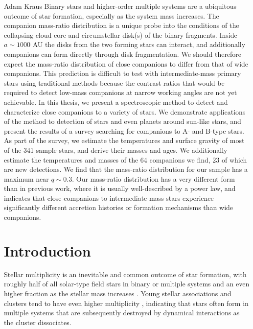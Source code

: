 \documentclass{utthesis}
\begin{document}
%
%

\begin{UTabstract}{Adam Kraus}
Binary stars and higher-order multiple systems are a ubiquitous outcome of star formation, especially as the system mass increases. The companion mass-ratio distribution is a unique probe into the conditions of the collapsing cloud core and circumstellar disk(s) of the binary fragments. Inside $a \sim 1000$ AU the disks from the two forming stars can interact, and additionally companions can form directly through disk fragmentation. We should therefore expect the mass-ratio distribution of close companions to differ from that of wide companions. This prediction is difficult to test with intermediate-mass primary stars using traditional methods because the contrast ratios that would be required to detect low-mass companions at narrow working angles are not yet achievable. In this thesis, we present a spectroscopic method to detect and characterize close companions to a variety of stars. We demonstrate applications of the method to detection of stars and even planets around sun-like stars, and present the results of a survey searching for companions to A- and B-type stars. As part of the survey, we estimate the temperatures and surface gravity of most of the 341 sample stars, and derive their masses and ages. We additionally estimate the temperatures and masses of the 64 companions we find, 23 of which are new detections. We find that the mass-ratio distribution for our sample has a maximum near $q \sim 0.3$. Our mass-ratio distribution has a very different form than in previous work, where it is usually well-described by a power law, and indicates that close companions to intermediate-mass stars experience significantly different accretion histories or formation mechanisms than wide companions.
\end{UTabstract}


\tableofcontents

\listoffigures

\mainmatter

\chapter{Introduction}

Stellar multiplicity is an inevitable and common outcome of star formation, with roughly half of all solar-type field stars in binary or multiple systems \citep{Raghavan2010} and an even higher fraction as the stellar mass increases \citep{Zinnecker2007}. Young stellar associations and clusters tend to have even higher multiplicity \citep{Duchene2013}, indicating that stars often form in multiple systems that are subsequently destroyed by dynamical interactions as the cluster dissociates. 
\end{document}

